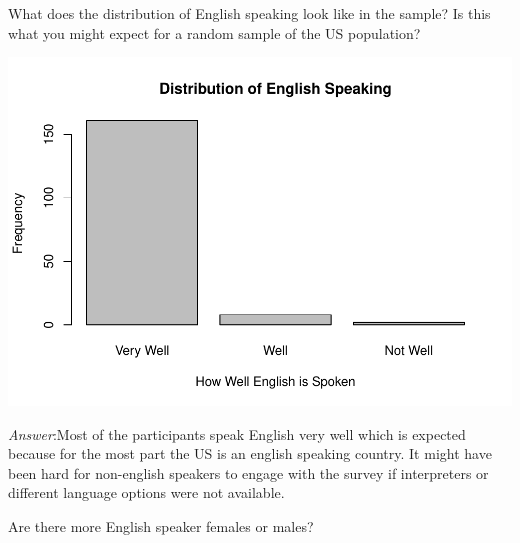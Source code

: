 \documentclass[
]{article}
\newenvironment{Shaded}{\begin{snugshade}}{\end{snugshade}}
\newcommand{\AttributeTok}[1]{\textcolor[rgb]{0.77,0.63,0.00}{#1}}
\newcommand{\ConstantTok}[1]{\textcolor[rgb]{0.00,0.00,0.00}{#1}}
\newcommand{\FunctionTok}[1]{\textcolor[rgb]{0.00,0.00,0.00}{#1}}
\newcommand{\NormalTok}[1]{#1}
\newcommand{\OtherTok}[1]{\textcolor[rgb]{0.56,0.35,0.01}{#1}}
\newcommand{\SpecialCharTok}[1]{\textcolor[rgb]{0.00,0.00,0.00}{#1}}
\newcommand{\StringTok}[1]{\textcolor[rgb]{0.31,0.60,0.02}{#1}}
\begin{document}
What does the distribution of English speaking look like in the sample?
Is this what you might expect for a random sample of the US population?

\begin{Shaded}
\end{Shaded}

\includegraphics{Assignments_files/figure-latex/unnamed-chunk-15-1.pdf}

\emph{Answer}:Most of the participants speak English very well which is
expected because for the most part the US is an english speaking
country. It might have been hard for non-english speakers to engage with
the survey if interpreters or different language options were not
available.

Are there more English speaker females or males?

\begin{Shaded}
\end{Shaded}
\end{document}

